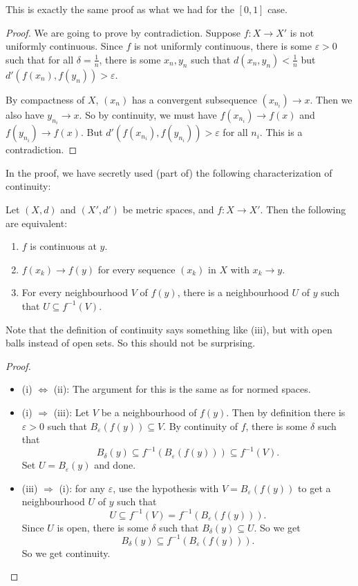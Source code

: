 \documentclass[a4paper]{article}
\begin{document}
This is exactly the same proof as what we had for the $[0, 1]$ case.
\begin{proof}
  We are going to prove by contradiction. Suppose $f: X \to X'$ is not uniformly continuous. Since $f$ is not uniformly continuous, there is some $\varepsilon > 0$ such that for all $\delta = \frac{1}{n}$, there is some $x_n, y_n$ such that $d(x_n, y_n) < \frac{1}{n}$ but $d'(f(x_n), f(y_n)) > \varepsilon$.

  By compactness of $X$, $(x_n)$ has a convergent subsequence $(x_{n_i}) \to x$. Then we also have $y_{n_i}\to x$. So by continuity, we must have $f(x_{n_i}) \to f(x)$ and $f(y_{n_i}) \to f(x)$. But $d'(f(x_{n_i}), f(y_{n_i})) > \varepsilon$ for all $n_i$. This is a contradiction.
\end{proof}

In the proof, we have secretly used (part of) the following characterization of continuity:
\begin{thm}
  Let $(X, d)$ and $(X', d')$ be metric spaces, and $f: X\to X'$. Then the following are equivalent:
  \begin{enumerate}
    \item $f$ is continuous at $y$.
    \item $f(x_k) \to f(y)$ for every sequence $(x_k)$ in $X$ with $x_k \to y$.
    \item For every neighbourhood $V$ of $f(y)$, there is a neighbourhood $U$ of $y$ such that $U\subseteq f^{-1}(V)$.
  \end{enumerate}
\end{thm}
Note that the definition of continuity says something like (iii), but with open balls instead of open sets. So this should not be surprising.

\begin{proof}\leavevmode
  \begin{itemize}
    \item (i) $\Leftrightarrow$ (ii): The argument for this is the same as for normed spaces.
    \item (i) $\Rightarrow$ (iii): Let $V$ be a neighbourhood of $f(y)$. Then by definition there is $\varepsilon > 0$ such that $B_\varepsilon (f(y)) \subseteq V$. By continuity of $f$, there is some $\delta$ such that
      \[
        B_\delta(y) \subseteq f^{-1}(B_\varepsilon(f(y))) \subseteq f^{-1}(V).
      \]
      Set $U = B_\varepsilon(y)$ and done.
    \item (iii) $\Rightarrow$ (i): for any $\varepsilon$, use the hypothesis with $V = B_\varepsilon (f(y))$ to get a neighbourhood $U$ of $y$ such that
      \[
        U \subseteq f^{-1}(V) = f^{-1}(B_{\varepsilon}(f(y))).
      \]
      Since $U$ is open, there is some $\delta$ such that $B_\delta(y) \subseteq U$. So we get
      \[
        B_\delta(y) \subseteq f^{-1}(B_\varepsilon(f(y))).
      \]
      So we get continuity.
  \end{itemize}
\end{proof}
\end{document}
